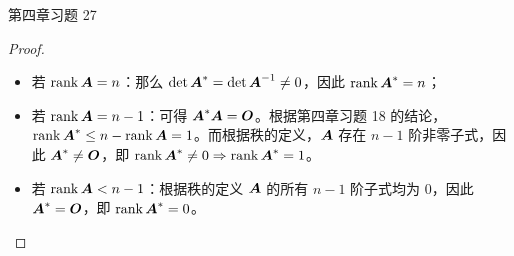 \begin{problem}
	第四章习题 27

	\begin{proof}
		\begin{itemize}
			\item 若 $\operatorname{rank} \boldsymbol{A} = n$：那么 $\det \boldsymbol{A}^* = \det \boldsymbol{A}^{-1} \neq 0$，因此 $\operatorname{rank} \boldsymbol{A}^* = n$；
			\item 若 $\operatorname{rank} \boldsymbol{A} = n-1$：可得 $\boldsymbol{A}^* \boldsymbol{A} = \boldsymbol{O}$。根据第四章习题 18 的结论，$\operatorname{rank} \boldsymbol{A}^* \le n - \operatorname{rank} \boldsymbol{A} = 1$。而根据秩的定义，$\boldsymbol{A}$ 存在 $n-1$ 阶非零子式，因此 $\boldsymbol{A}^* \neq \boldsymbol{O}$，即 $\operatorname{rank} \boldsymbol{A}^* \neq 0 \Rightarrow \operatorname{rank} \boldsymbol{A}^* = 1$。
			\item 若 $\operatorname{rank} \boldsymbol{A} < n-1$：根据秩的定义 $\boldsymbol{A}$ 的所有 $n-1$ 阶子式均为 $0$，因此 $\boldsymbol{A}^* = \boldsymbol{O}$，即 $\operatorname{rank} \boldsymbol{A}^* = 0$。
		\end{itemize}
	\end{proof}
\end{problem}

